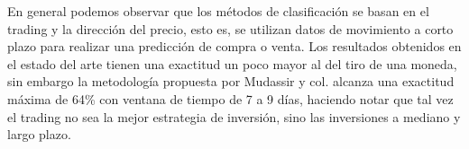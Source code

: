 En general podemos observar que los métodos de clasificación se basan en el trading y la dirección del precio, esto es, se utilizan datos de movimiento a corto plazo para realizar una predicción de compra o venta. Los resultados obtenidos en el estado del arte  tienen una exactitud un poco mayor al del tiro de una moneda, sin embargo la metodología propuesta por Mudassir y col. \parencite*{mudassirTimeseriesForecastingBitcoin2020} alcanza una exactitud máxima de 64\% con ventana de tiempo de 7 a 9 días, haciendo notar que tal vez el trading no sea la mejor estrategia de inversión, sino las inversiones a mediano y largo plazo.
